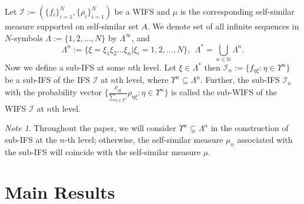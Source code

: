 \documentclass{amsproc}
\theoremstyle{definition}
\newtheorem{definition}[theorem]{Definition}
\theoremstyle{remark}
\newtheorem{remark}[theorem]{Remark}
\newtheorem{note}[theorem]{Note}
\numberwithin{equation}{section}
\begin{document}
Let $\mathcal{I}:=(\{f_i\}_{i=1}^N, \{\rho_i\}_{i=1}^N)$ be a WIFS and $\mu$ is the corresponding self-similar measure supported on self-similar set $A.$
We denote set of all infinite sequences in $N$-symbols $\Lambda:=\{1,2,\ldots,N\}$ by $\Lambda^\infty$, and  $$\Lambda^n:= \{\xi= \xi_1 \xi_2\ldots \xi_n | \xi_i = 1,2,\ldots ,N\},~~ \Lambda^*= \bigcup_{n \in \mathbb{N}} \Lambda^n.$$
Now we define a sub-IFS at some $n$th level. Let $\xi \in \Lambda^*$ then $\mathcal{I}_n:= \{f_{\eta \xi}: \eta \in {\Upsilon}^n\}$ be a sub-IFS of the IFS $\mathcal{I}$ at $n$th level, where ${\Upsilon}^n \subseteq \Lambda^n.$ Further, the sub-IFS $\mathcal{I}_n$ with the probability vector $\big\{\frac{\rho_{\eta \xi}}{\sum_{\eta \in {\Upsilon}^n}} \rho_{\eta \xi} : \eta \in {\Upsilon}^n \big\}$ is called the sub-WIFS of the WIFS $\mathcal{I}$ at $n$th level.
\begin{note}
    Throughout the paper, we will consider $\Upsilon^n \subsetneq \Lambda^n$ in the construction of sub-IFS at the $n$-th level; otherwise, the self-similar measure $\mu_n$ associated with the sub-IFS will coincide with the self-similar measure $\mu$. 
\end{note}
\section{Main Results}
\end{document}
